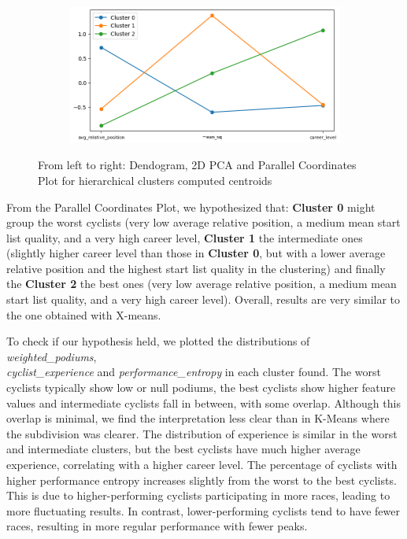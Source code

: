 \begin{figure}[H]
\begin{subfigure}[b]{0.33\textwidth}
    \end{subfigure}
    \begin{subfigure}[b]{0.5\textwidth}
        \includegraphics[width=\textwidth]{images/CLUSTER/hierarchical/coordinates_hier.png}
    \end{subfigure}
    \caption{ \small From left to right: Dendogram, 2D PCA and Parallel Coordinates Plot for hierarchical clusters computed centroids }
    \label{fig:hier-plots}
\end{figure}

\noindent From the Parallel Coordinates Plot, we hypothesized that: \textbf{Cluster 0} might group the worst cyclists (very low average relative position, a medium mean start list quality, and a very high career level, \textbf{Cluster 1} the intermediate ones (slightly higher career level than those in \textbf{Cluster 0}, but with a lower average relative position and the highest start list quality in the clustering) and finally the \textbf{Cluster 2} the best ones (very low average relative position, a medium mean start list quality, and a very high career level). Overall, results are very similar to the one obtained with X-means.

To check if our hypothesis held, we plotted the distributions of \textit{weighted\_podiums}, \\\textit{cyclist\_experience} and \textit{performance\_entropy} in each cluster found. The worst cyclists typically show low or null podiums, the best cyclists show higher feature values and intermediate cyclists fall in between, with some overlap. Although this overlap is minimal, we find the interpretation less clear than in K-Means where the subdivision was clearer. The distribution of experience is similar in the worst and intermediate clusters, but the best cyclists have much higher average experience, correlating with a higher career level. The percentage of cyclists with higher performance entropy increases slightly from the worst to the best cyclists. This is due to higher-performing cyclists participating in more races, leading to more fluctuating results. In contrast, lower-performing cyclists tend to have fewer races, resulting in more regular performance with fewer peaks. \\

